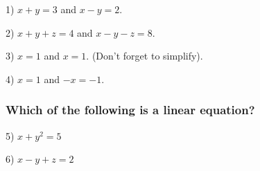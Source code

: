 \documentclass[a4paper,twoside,12pt]{memoir}  %
\begin{document}
\begin{list}{}
\item 1) $x + y = 3$ and $x - y = 2$.
\item 2) $x + y + z = 4$ and $x - y - z = 8$.
\item 3) $x = 1$ and $x = 1$. (Don't forget to simplify).
\item 4) $x = 1$ and $-x = -1$.
\end{list}

\subsubsection{Which of the following is a linear equation?}
\begin{list}{}
\item 5) $x + y^2 = 5$
\item 6) $x - y  + z= 2$

\end{list}
\end{document}
